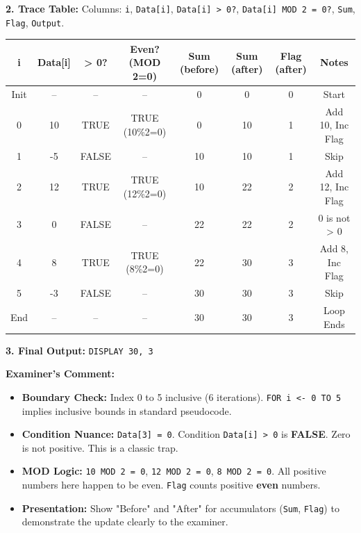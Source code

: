\documentclass[11pt]{article}
\begin{document}
\begin{exoresolu}
\noindent\textbf{2. Trace Table:}
Columns: \texttt{i}, \texttt{Data[i]}, \texttt{Data[i] > 0?}, \texttt{Data[i] MOD 2 = 0?}, \texttt{Sum}, \texttt{Flag}, \texttt{Output}.

\begin{center}
\begin{tabular}{|c|c|c|c|c|c|c|c|}\hline
\rowcolor{popblueL}
\textbf{i} & \textbf{Data[i]} & \textbf{> 0?} & \textbf{Even? (MOD 2=0)} & \textbf{Sum (before)} & \textbf{Sum (after)} & \textbf{Flag (after)} & \textbf{Notes} \\ \hline
Init & -- & -- & -- & 0 & 0 & 0 & Start \\ \hline
0 & 10 & TRUE & TRUE (10\%2=0) & 0 & 10 & 1 & Add 10, Inc Flag \\ \hline
1 & -5 & FALSE & -- & 10 & 10 & 1 & Skip \\ \hline
2 & 12 & TRUE & TRUE (12\%2=0) & 10 & 22 & 2 & Add 12, Inc Flag \\ \hline
3 & 0 & FALSE & -- & 22 & 22 & 2 & 0 is not > 0 \\ \hline
4 & 8 & TRUE & TRUE (8\%2=0) & 22 & 30 & 3 & Add 8, Inc Flag \\ \hline
5 & -3 & FALSE & -- & 30 & 30 & 3 & Skip \\ \hline
End & -- & -- & -- & 30 & 30 & 3 & Loop Ends \\ \hline
\end{tabular}
\end{center}

\noindent\textbf{3. Final Output:}
\texttt{DISPLAY 30, 3}

\noindent\textbf{Examiner's Comment:}
\begin{itemize}
    \item \textbf{Boundary Check:} Index 0 to 5 inclusive (6 iterations). \texttt{FOR i <- 0 TO 5} implies inclusive bounds in standard pseudocode.
    \item \textbf{Condition Nuance:} \texttt{Data[3] = 0}. Condition \texttt{Data[i] > 0} is \textbf{FALSE}. Zero is not positive. This is a classic trap.
    \item \textbf{MOD Logic:} \texttt{10 MOD 2 = 0}, \texttt{12 MOD 2 = 0}, \texttt{8 MOD 2 = 0}. All positive numbers here happen to be even. \texttt{Flag} counts positive \textbf{even} numbers.
    \item \textbf{Presentation:} Show "Before" and "After" for accumulators (\texttt{Sum}, \texttt{Flag}) to demonstrate the update clearly to the examiner.
\end{itemize}
\end{exoresolu}
\end{document}
